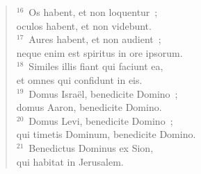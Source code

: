 \begin{flushleft}
\begin{verse}
${}^{16}$~Os habent, et non loquentur~;\\ oculos habent, et non videbunt.\\
${}^{17}$~Aures habent, et non audient~;\\ neque enim est spiritus in ore ipsorum.\\
${}^{18}$~Similes illis fiant qui faciunt ea,\\ et omnes qui confidunt in eis.\\
${}^{19}$~Domus Isra\"el, benedicite Domino~;\\ domus Aaron, benedicite Domino.\\
${}^{20}$~Domus Levi, benedicite Domino~;\\ qui timetis Dominum, benedicite Domino.\\
${}^{21}$~Benedictus Dominus ex Sion,\\ qui habitat in Jerusalem.\end{verse}\end{flushleft}



